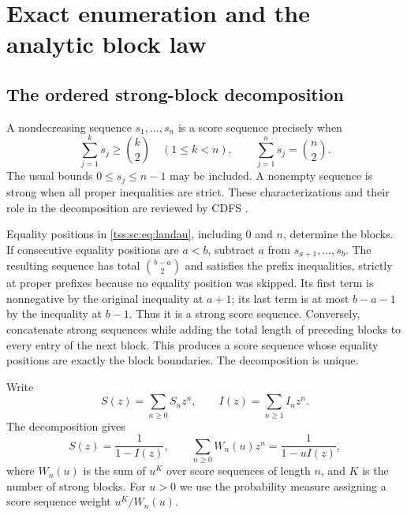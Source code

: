 \documentclass[11pt]{article}
\theoremstyle{remark}\newtheorem{remark}[theorem]{Remark}
\theoremstyle{definition}\newtheorem{definition}[theorem]{Definition}
\begin{document}
\section{Exact enumeration and the analytic block law}
\label{tss:sc:sec:exact}

\subsection{The ordered strong-block decomposition}
A nondecreasing sequence $s_1,\ldots,s_n$ is a score sequence precisely when
\begin{equation}\label{tss:sc:eq:landau}
 \sum_{j=1}^k s_j\geq\binom{k}{2}\quad(1\leq k<n),
 \qquad \sum_{j=1}^n s_j=\binom n2.
\end{equation}
The usual bounds $0\leq s_j\leq n-1$ may be included. A nonempty sequence is strong when all proper inequalities are strict. These characterizations and their role in the decomposition are reviewed by CDFS \cite{CDFS}.

Equality positions in \eqref{tss:sc:eq:landau}, including $0$ and $n$, determine the blocks. If consecutive equality positions are $a<b$, subtract $a$ from $s_{a+1},\ldots,s_b$. The resulting sequence has total $\binom{b-a}{2}$ and satisfies the prefix inequalities, strictly at proper prefixes because no equality position was skipped. Its first term is nonnegative by the original inequality at $a+1$; its last term is at most $b-a-1$ by the inequality at $b-1$. Thus it is a strong score sequence. Conversely, concatenate strong sequences while adding the total length of preceding blocks to every entry of the next block. This produces a score sequence whose equality positions are exactly the block boundaries. The decomposition is unique.

Write
\begin{equation}\label{tss:sc:eq:SI}
 S(z)=\sum_{n\geq0}S_nz^n,\qquad I(z)=\sum_{n\geq1}I_nz^n.
\end{equation}
The decomposition gives
\begin{equation}\label{tss:sc:eq:blockgf}
 S(z)=\frac1{1-I(z)},\qquad
 \sum_{n\geq0}W_n(u)z^n=\frac1{1-uI(z)},
\end{equation}
where $W_n(u)$ is the sum of $u^{K}$ over score sequences of length $n$, and $K$ is the number of strong blocks. For $u>0$ we use the probability measure assigning a score sequence weight $u^K/W_n(u)$.
\end{document}
